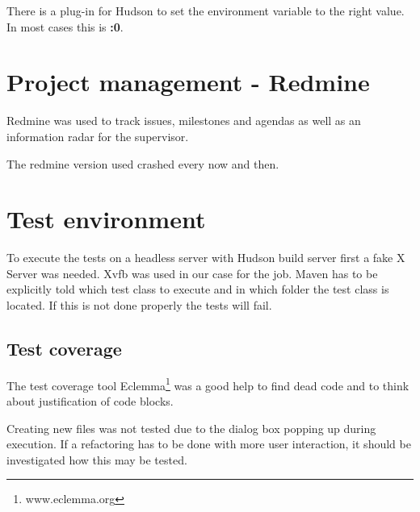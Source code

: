 There is a plug-in for Hudson to set the environment variable to
the right value. In most cases this is \textbf{:0}.

\section{Project management - Redmine}

Redmine was used to track issues, milestones and agendas as well as an 
information radar for the supervisor.

The redmine version used crashed every now and then. 

\section{Test environment}

To execute the tests on a headless server with Hudson build server first a fake
X Server was needed. Xvfb was used in our case for the job. Maven has to be
explicitly told which test class to execute and in which folder the test class
is located. If this is not done properly the tests will fail.

\subsection{Test coverage}

The test coverage tool Eclemma\footnote{www.eclemma.org} was a good help to find dead code and to think 
about justification of code blocks. 

Creating new files was not tested due to the dialog box popping up during 
execution. If a refactoring has to be done with more user interaction, it
should be investigated how this may be tested. 
